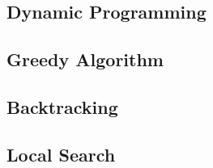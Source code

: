

\subsection{Dynamic Programming}



\subsection{Greedy Algorithm}



\subsection{Backtracking}

\subsection{Local Search}

%